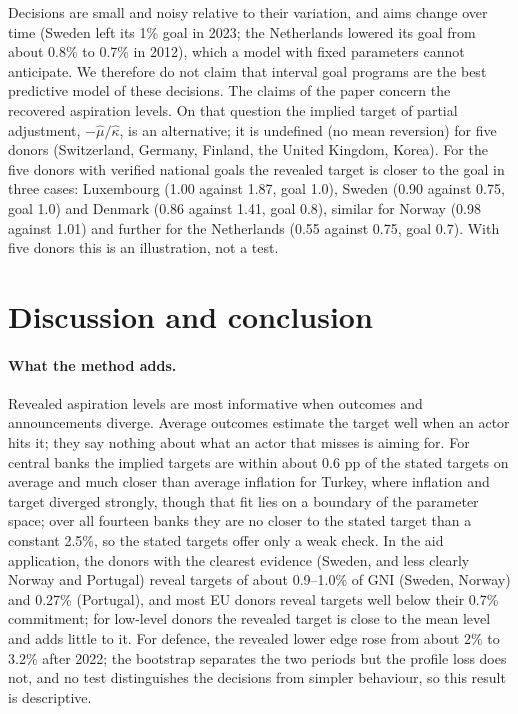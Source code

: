 \documentclass[11pt,a4paper]{article}
\theoremstyle{remark}\newtheorem{remark}{Remark}
\begin{document}
Decisions are small and noisy relative to their variation, and aims change over time (Sweden left its 1\% goal in 2023; the Netherlands lowered its goal from about 0.8\% to 0.7\% in 2012), which a model with fixed parameters cannot anticipate. We therefore do not claim that interval goal programs are the best predictive model of these decisions. The claims of the paper concern the recovered aspiration levels. On that question the implied target of partial adjustment, $-\hat\mu/\hat\kappa$, is an alternative; it is undefined (no mean reversion) for five donors (Switzerland, Germany, Finland, the United Kingdom, Korea). For the five donors with verified national goals the revealed target is closer to the goal in three cases: Luxembourg (1.00 against 1.87, goal 1.0), Sweden (0.90 against 0.75, goal 1.0) and Denmark (0.86 against 1.41, goal 0.8), similar for Norway (0.98 against 1.01) and further for the Netherlands (0.55 against 0.75, goal 0.7). With five donors this is an illustration, not a test.
\begin{table}[t]\centering\small
\caption{Out-of-sample mean absolute decision error of the goal program (GP), linear partial adjustment or difference Taylor rule (PA), always holding, and the median change; last column: number of units for which GP has the lowest error.}\label{tab:mcomp}\end{table}

\section{Discussion and conclusion}\label{sec:disc}
\paragraph{What the method adds.} Revealed aspiration levels are most informative when outcomes and announcements diverge. Average outcomes estimate the target well when an actor hits it; they say nothing about what an actor that misses is aiming for. For central banks the implied targets are within about 0.6 pp of the stated targets on average and much closer than average inflation for Turkey, where inflation and target diverged strongly, though that fit lies on a boundary of the parameter space; over all fourteen banks they are no closer to the stated target than a constant 2.5\%, so the stated targets offer only a weak check. In the aid application, the donors with the clearest evidence (Sweden, and less clearly Norway and Portugal) reveal targets of about 0.9--1.0\% of GNI (Sweden, Norway) and 0.27\% (Portugal), and most EU donors reveal targets well below their 0.7\% commitment; for low-level donors the revealed target is close to the mean level and adds little to it. For defence, the revealed lower edge rose from about 2\% to 3.2\% after 2022; the bootstrap separates the two periods but the profile loss does not, and no test distinguishes the decisions from simpler behaviour, so this result is descriptive.
\end{document}
